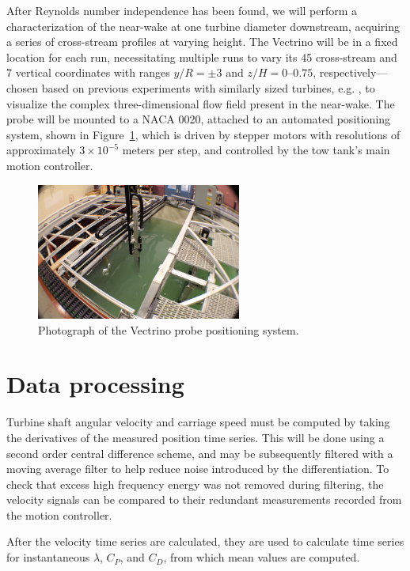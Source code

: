 \documentclass[12pt,letterpaper]{scrreprt}
\begin{document}
After Reynolds number independence has been found, we will perform a
characterization of the near-wake at one turbine diameter downstream, acquiring
a series of cross-stream profiles at varying height. The Vectrino will be in a
fixed location for each run, necessitating multiple runs to vary its 45
cross-stream and 7 vertical coordinates with ranges $y/R = \pm 3$ and $z/H =
0$--$0.75$, respectively---chosen based on previous experiments with similarly
sized turbines, e.g. \cite{Bachant2013}, to visualize the complex
three-dimensional flow field present in the near-wake. The probe will be mounted
to a NACA 0020, attached to an automated positioning system, shown in
Figure~\ref{fig-yz_traverse}, which is driven by stepper motors with resolutions
of approximately $3 \times 10^{-5}$ meters per step, and controlled by the tow
tank's main motion controller.

\begin{figure}[ht]
\centering
\includegraphics[width=0.6\textwidth]{Figures/yz_traverse}
\caption{Photograph of the Vectrino probe positioning system.}
\label{fig-yz_traverse}
\end{figure}

\section{Data processing}

Turbine shaft angular velocity and carriage speed must be computed by taking the
derivatives of the measured position time series. This will be done using a
second order central difference scheme, and may be subsequently filtered with a
moving average filter to help reduce noise introduced by the differentiation. To
check that excess high frequency energy was not removed during filtering, the
velocity signals can be compared to their redundant measurements recorded from
the motion controller.

After the velocity time series are calculated, they are used to calculate time
series for instantaneous $\lambda$, $C_P$, and $C_D$, from which mean values are
computed.
\end{document}
